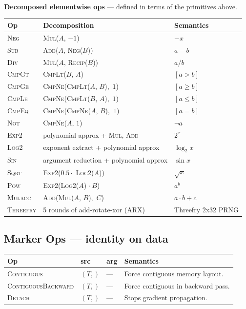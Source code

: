 \documentclass[10pt,letterpaper]{article}
\newcommand{\op}[1]{\textsc{#1}}
\begin{document}
\medskip
\textbf{Decomposed elementwise ops} --- defined in terms of the primitives above.

\smallskip
\begin{tabular}{@{}l l l@{}}
\toprule
\textbf{Op} & \textbf{Decomposition} & \textbf{Semantics} \\
\midrule
\op{Neg} & \op{Mul}($A$, $-1$) & $-x$ \\
\op{Sub} & \op{Add}($A$, \op{Neg}($B$)) & $a - b$ \\
\op{Div} & \op{Mul}($A$, \op{Recip}($B$)) & $a / b$ \\
\op{CmpGt} & \op{CmpLt}($B$, $A$) & $[a > b]$ \\
\op{CmpGe} & \op{CmpNe}(\op{CmpLt}($A$, $B$),\, $1$) & $[a \ge b]$ \\
\op{CmpLe} & \op{CmpNe}(\op{CmpLt}($B$, $A$),\, $1$) & $[a \le b]$ \\
\op{CmpEq} & \op{CmpNe}(\op{CmpNe}($A$, $B$),\, $1$) & $[a = b]$ \\
\op{Not} & \op{CmpNe}($A$, $1$) & $\lnot a$ \\[4pt]
\op{Exp2} & polynomial approx + \op{Mul}, \op{Add} & $2^x$ \\
\op{Log2} & exponent extract + polynomial approx & $\log_2 x$ \\
\op{Sin} & argument reduction + polynomial approx & $\sin x$ \\
\op{Sqrt} & \op{Exp2}($0.5 \cdot$ \op{Log2}($A$)) & $\sqrt{x}$ \\
\op{Pow} & \op{Exp2}(\op{Log2}($A$) $\cdot\, B$) & $a^b$ \\
\op{Mulacc} & \op{Add}(\op{Mul}($A$, $B$),\, $C$) & $a \cdot b + c$ \\
\op{Threefry} & 5 rounds of add-rotate-xor (ARX) & Threefry 2x32 PRNG \\
\bottomrule
\end{tabular}

\subsection*{{\color{markerorange}Marker Ops} \normalfont\small--- identity on data}

\begin{tabular}{@{}l l l l@{}}
\toprule
\textbf{Op} & \textbf{src} & \textbf{arg} & \textbf{Semantics} \\
\midrule
\op{Contiguous} & $(T,)$ & --- & Force contiguous memory layout. \\
\op{ContiguousBackward} & $(T,)$ & --- & Force contiguous in backward pass. \\
\op{Detach} & $(T,)$ & --- & Stops gradient propagation. \\
\bottomrule
\end{tabular}
\end{document}
